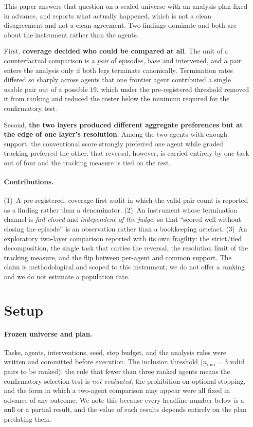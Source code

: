 \documentclass{article}
\begin{document}
This paper answers that question on a sealed universe with an analysis plan fixed in advance, and reports what actually happened, which is not a clean disagreement and not a clean agreement.
Two findings dominate and both are about the instrument rather than the agents.

First, \textbf{coverage decided who could be compared at all}.
The unit of a counterfactual comparison is a \emph{pair} of episodes, base and intervened, and a pair enters the analysis only if both legs terminate canonically.
Termination rates differed so sharply across agents that one frontier agent contributed a single usable pair out of a possible $19$, which under the pre-registered threshold removed it from ranking and reduced the roster below the minimum required for the confirmatory test.

Second, \textbf{the two layers produced different aggregate preferences but at the edge of one layer's resolution}.
Among the two agents with enough support, the conventional score strongly preferred one agent while graded tracking preferred the other; that reversal, however, is carried entirely by one task out of four and the tracking measure is tied on the rest.

\paragraph{Contributions.}
(1)~A pre-registered, coverage-first audit in which the valid-pair count is reported as a finding rather than a denominator.
(2)~An instrument whose termination channel is \emph{fail-closed} and \emph{independent of the judge}, so that ``scored well without closing the episode'' is an observation rather than a bookkeeping artefact.
(3)~An exploratory two-layer comparison reported with its own fragility: the strict/tied decomposition, the single task that carries the reversal, the resolution limit of the tracking measure, and the flip between per-agent and common support.
The claim is methodological and scoped to this instrument; we do not offer a ranking and we do not estimate a population rate.

\section{Setup}
\label{sec:setup}

\paragraph{Frozen universe and plan.}
Tasks, agents, interventions, seed, step budget, and the analysis rules were written and committed before execution.
The inclusion threshold ($n_{\min}=3$ valid pairs to be ranked), the rule that fewer than three ranked agents means the confirmatory selection test is \emph{not evaluated}, the prohibition on optional stopping, and the form in which a two-agent comparison may appear were all fixed in advance of any outcome.
We note this because every headline number below is a null or a partial result, and the value of such results depends entirely on the plan predating them.
\end{document}
